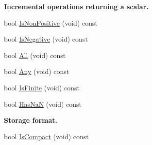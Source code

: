 \begin{Indent}{\bf Incremental operations returning a scalar.}
\begin{DoxyCompactItemize}
bool \hyperlink{classvct_dynamic_const_n_array_base_a6db845f0bc3dc8a202f01efcbd324534}{Is\+Non\+Positive} (void) const 
\item 
bool \hyperlink{classvct_dynamic_const_n_array_base_aa857ba5eb1c2e42c835d64812d189e02}{Is\+Negative} (void) const 
\item 
bool \hyperlink{classvct_dynamic_const_n_array_base_a28488dcd24829cba9e3d2a45d8627c16}{All} (void) const 
\item 
bool \hyperlink{classvct_dynamic_const_n_array_base_aae8f05f6031a18f2289f6bb3a7fb5062}{Any} (void) const 
\item 
bool \hyperlink{classvct_dynamic_const_n_array_base_a75a5eb704992360d1c94e61190e3e052}{Is\+Finite} (void) const 
\item 
bool \hyperlink{classvct_dynamic_const_n_array_base_ab610e1bff1589b1198abe536e7023e54}{Has\+Na\+N} (void) const 
\end{DoxyCompactItemize}
\end{Indent}
\begin{Indent}{\bf Storage format.}\par
\begin{DoxyCompactItemize}
\item 
bool \hyperlink{classvct_dynamic_const_n_array_base_a55cacc58ae8e57eba5121566689611dc}{Is\+Compact} (void) const 
\end{DoxyCompactItemize}
\end{Indent}
